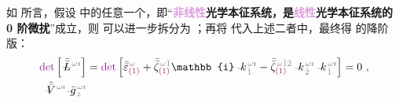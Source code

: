 如  所言，假设  中的任意一个，即“\textbf{\textcolor{Plum}{非线性}\textcolor{NavyBlue}{光学}\textcolor{PineGreen}{本征系统}，是\textcolor{Plum}{线性}\textcolor{NavyBlue}{光学}\textcolor{PineGreen}{本征系统}的 \textcolor{NavyBlue}{0 阶微扰}}”成立，则  可以进一步拆分为 ；再将  代入上述二者中，最终得  的降阶版：
\begin{subequations} \label{eq:nonlinear(2)-wave_wkrho-simplify6'}
\begin{align}
	\textcolor{Plum}{\det} \left[ \xint{\mathcolor{gray}{-}}{32}{\bar{\bar{L}}}^{\;\! \mathcolor{gray}{\omega} \textcolor{PineGreen}{\imath}} \right] &= \textcolor{Plum}{\det} \left[ \bar{\bar{\varepsilon}}^{\;\! \mathcolor{gray}{\omega}}_{\textcolor{Maroon}{(1)}} + \bar{\bar{\zeta}}^{\;\! \mathcolor{gray}{\omega} \mathcolor{gray}{\check{1}}}_{\textcolor{Maroon}{(1)}} \mathbb{i} \xint{\begin{smallmatrix} ~ \\ {}^{}_{\mathcolor{gray}{-}} \\ ~ \end{smallmatrix}}{15}{k}_{\;\! \mathcolor{gray}{\check{1}}}^{\;\! \mathcolor{gray}{\omega} \textcolor{PineGreen}{\imath}} - \bar{\bar{\zeta}}^{\;\! \mathcolor{gray}{\omega} \mathcolor{gray}{\check{1} \check{2}}}_{\textcolor{Maroon}{(1)}} \xint{\begin{smallmatrix} ~ \\ {}^{}_{\mathcolor{gray}{-}} \\ ~ \end{smallmatrix}}{15}{k}_{\;\! \mathcolor{gray}{\check{2}}}^{\;\! \mathcolor{gray}{\omega} \textcolor{PineGreen}{\imath}} \xint{\begin{smallmatrix} ~ \\ {}^{}_{\mathcolor{gray}{-}} \\ ~ \end{smallmatrix}}{15}{k}_{\;\! \mathcolor{gray}{\check{1}}}^{\;\! \mathcolor{gray}{\omega} \textcolor{PineGreen}{\imath}} \right] = 0 ~, \label{eq:nonlinear(2)-wave_wkrho-simplify6-L3'} \\
	\xint{\mathcolor{gray}{-}}{25}{\bar{\bar{V}}}^{\;\! \mathcolor{gray}{\omega} \textcolor{PineGreen}{\imath}} \xint{{}^{}_{\mathcolor{gray}{-}}}{10}{\bar{g}}^{\;\!\mathcolor{gray}{\omega} \textcolor{PineGreen}{\imath}}_{\;\! \mathcolor{gray}{z}}

\end{align}
\end{subequations}
